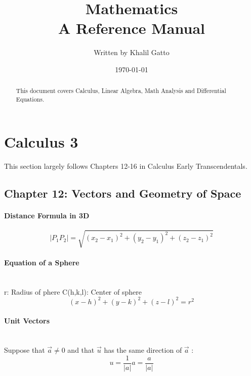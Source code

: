 \documentclass{article}
\title{Mathematics\\A Reference Manual}
\author{Written by Khalil Gatto}
\date{\today}
\begin{document}
\maketitle

\begin{abstract}
    This document covers Calculus, Linear Algebra, Math Analysis and Differential Equations.
\end{abstract}

\section*{Calculus 3}
This section largely follows Chapters 12-16 in Calculus Early Transcendentals.

\subsection*{Chapter 12: Vectors and Geometry of Space}

\paragraph{Distance Formula in 3D}
\begin{equation} 
    \label{eq:Distance Formula in 3D}
    |P_1P_2| = \sqrt{(x_2 - x_1)^2 + (y_2 - y_1)^2 + (z_2 - z_1)^2} 
\end{equation}

\paragraph{Equation of a Sphere}\mbox{}\\
r: Radius of phere
\newline
C(h,k,l): Center of sphere
\begin{equation}
    \label{eq:Equation of a Sphere}
    (x - h)^2 + (y-k)^2 + (z-l)^2 = r^2
\end{equation}

\paragraph{Unit Vectors}\mbox{}\\ %
Suppose that \(\vec{a} \neq 0\) and that \(\vec{u}\) has the same direction of \(\vec{a}\) :
\begin{equation}
    \label{eq:Unit Vector}
    u = \frac{1}{|a|} a = \frac{a}{|a|}
\end{equation}
\end{document}
